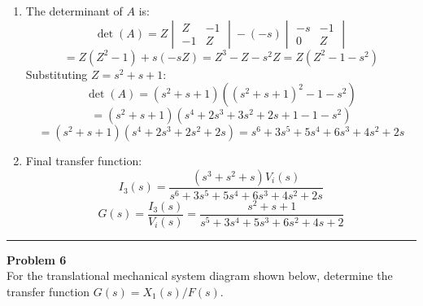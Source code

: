 \documentclass[11pt]{article}
\newcommand{\hspring}[2]{%
      \draw[spring] (#1) -- ++(2,0) node[midway, above=0.25cm]{#2};
    }
\newcommand{\hdamper}[2]{%
      \begin{scope}[shift={#1}]
        \draw (0,0) -- (0.5,0);                  %
        \draw (0.5,0) -- (0.5,0.3) -- (1.5,0.3);  %
        \draw (0.5,0) -- (0.5,-0.3) -- (1.5,-0.3);%
        
        \draw (1.0,0) -- (1.0,0.15);
        \draw (1.0,0) -- (1.0,-0.15);
        
        \draw (1.0,0) -- (2.0,0);
    
        \node[above] at (1,0.3) {#2};
      \end{scope}
    }
\newcommand{\tbody}[4]{
    \node[tbody] (#4) at (#1) {#2};
    \node at ([yshift=20mm]#4.center) {#3};
    \draw ([yshift=11mm]#4.center) -- ([yshift=18mm]#4.center);
    \draw[->] ([yshift=16mm, xshift=-4mm]#4.center) -- ([yshift=16mm, xshift=5mm]#4.center);
    }
\begin{document}
\begin{enumerate}[label=(\alph*), itemindent=*, leftmargin=*, nolistsep]
    \item The determinant of \( A \) is:
    \[
    \det(A) = Z \begin{vmatrix} Z & -1 \\ -1 & Z \end{vmatrix} - (-s) \begin{vmatrix} -s & -1 \\ 0 & Z \end{vmatrix}
    \]
    \[
    = Z(Z^2 - 1) + s(-sZ) = Z^3 - Z - s^2Z = Z(Z^2 - 1 - s^2)
    \]
    Substituting $Z = s^2 + s + 1$:
    \[
    \det(A) = (s^2 + s + 1)((s^2 + s + 1)^2 - 1 - s^2)
    \]
    \[
    = (s^2 + s + 1)(s^4 + 2s^3 + 3s^2 + 2s + 1 - 1 - s^2)
    \]
    \[
    = (s^2 + s + 1)(s^4 + 2s^3 + 2s^2 + 2s) = s^6 + 3s^5 + 5s^4 + 6s^3 + 4s^2 + 2s
    \]

    \item Final transfer function:
    \[
    I_3(s) = \frac{(s^3 + s^2 + s)V_i(s)}{s^6 + 3s^5 + 5s^4 + 6s^3 + 4s^2 + 2s}
    \]
    \[
    \boxed{
    G(s) = \frac{I_3(s)}{V_i(s)} = \frac{s^2 + s + 1}{s^5 + 3s^4 + 5s^3 + 6s^2 + 4s + 2}
    }
    \]
\end{enumerate}

\newpage
  \setcounter{page}{9}  
\noindent\rule{\textwidth}{1pt}
\noindent\textbf{Problem 6} \hfill
\\For the translational mechanical system diagram shown below, determine the transfer function $G(s)=X_1(s)/F(s)$.

\begin{center}
\end{center}
\end{document}
